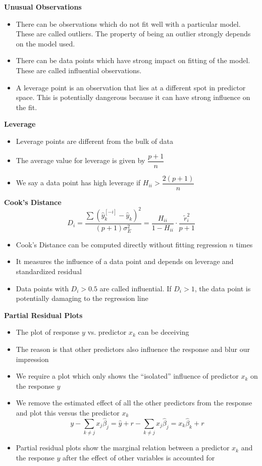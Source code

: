 \documentclass[a4paper]{article}
\begin{document}
\textbf{Unusual Observations}
\begin{itemize}
    \item There can be observations which do not fit well with a particular model. These are called outliers. The property of being an outlier strongly depends on the model used.
    \item There can be data points which have strong impact on fitting of the model. These are called influential observations.
    \item A leverage point is an observation that lies at a different spot in predictor space. This is potentially dangerous because it can have strong influence on the fit.
\end{itemize}

\textbf{Leverage}
\begin{itemize}
    \item Leverage points are different from the bulk of data
    \item The average value for leverage is given by $\dfrac{p+1}{n}$
    \item We say a data point has high leverage if $H_{ii}>\dfrac{2(p+1)}{n}$
\end{itemize}

\textbf{Cook's Distance}
\[D_i=\frac{\sum(\hat{y}_k^{[-i]}-\hat{y}_k )^2}{(p+1)\sigma_E^2}=\frac{H_{ii}}{1-H_{ii}}\cdot\frac{\tilde{r}_i^2}{p+1} \]
\begin{itemize}
    \item Cook's Distance can be computed directly without fitting regression $n$ times
    \item It measures the influence of a data point and depends on leverage and standardized residual
    \item Data points with $D_i>0.5$ are called influential. If $D_i>1$, the data point is potentially damaging to the regression line
\end{itemize}

\textbf{Partial Residual Plots}
\begin{itemize}
    \item The plot of response $y$ vs. predictor $x_k$ can be deceiving
    \item The reason is that other predictors also influence the response and blur our impression
    \item We require a plot which only shows the ``isolated'' influence of predictor $x_k$ on the response $y$
    \item We remove the estimated effect of all the other predictors from the response and plot this versus the predictor $x_k$
    \[y-\sum_{k\neq j}x_j\hat{\beta}_j=\hat{y}+r-\sum_{k\neq j}x_j\hat{\beta}_j=x_k\hat{\beta}_k+r \]
    \item Partial residual plots show the marginal relation between a predictor $x_k$ and the response $y$ after the effect of other variables is accounted for
\end{itemize}
\end{document}
